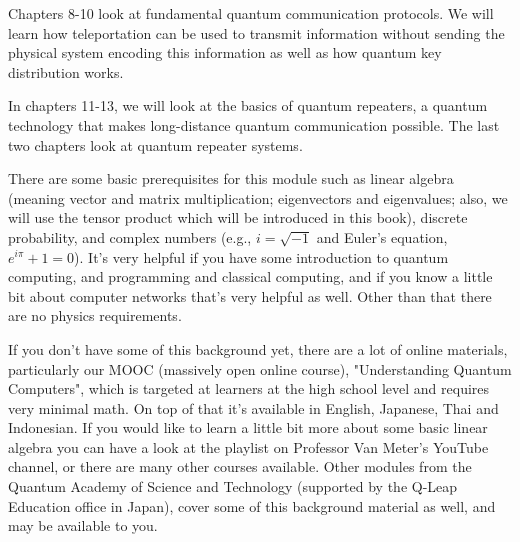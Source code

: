 Chapters 8-10 look at fundamental quantum communication protocols.
We will learn how teleportation can be used to transmit information without sending the physical system encoding this information as well as how quantum key distribution works.

In chapters 11-13, we will look at the basics of quantum repeaters, a quantum technology that makes long-distance quantum communication possible.
The last two chapters look at quantum repeater systems.

There are some basic prerequisites for this module such as linear algebra (meaning vector and matrix multiplication; eigenvectors and eigenvalues; also, we will use the tensor product which will be introduced in this book), discrete probability, and complex numbers (e.g., $i = \sqrt{-1}$ and Euler's equation, $e^{i\pi} + 1 = 0$). It's very helpful if you have some introduction to quantum computing, and programming and classical computing, and if you know a little bit about computer networks that's very helpful as well.
Other than that there are no physics requirements.

If you don't have some of this background yet, there are a lot of online materials, particularly our MOOC (massively open online course), "Understanding Quantum Computers", which is targeted at learners at the high school level and requires very minimal math.
On top of that it's available in English, Japanese, Thai and Indonesian.
If you would like to learn a little bit more about some basic linear algebra you can have a look at the playlist on Professor Van Meter's YouTube channel, or there are many other courses available. Other modules from the Quantum Academy of Science and Technology (supported by the Q-Leap Education office in Japan), cover some of this background material as well, and may be available to you.





